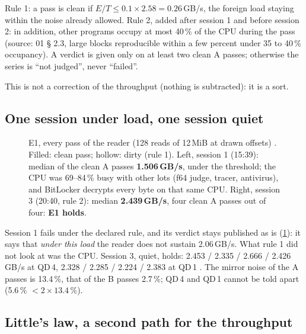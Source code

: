 \begin{definition}\label{def:t2c-propre}
Rule 1: a pass is clean if $E/T \le 0.1 \times 2.58 = 0.26$\,GB/s, the foreign load staying within the noise already allowed. Rule 2, added after session 1 and before session 2: in addition, other programs occupy at most 40\,\% of the CPU during the pass (source: 01 § 2.3, large blocks reproducible within a few percent under 35 to 40\,\% occupancy). A verdict is given only on at least two clean A passes; otherwise the series is ``not judged'', never ``failed''.
\end{definition}

This is not a correction of the throughput (nothing is subtracted): it is a sort.

\subsection{One session under load, one session quiet}

\begin{figure}[ht]
\centering
\GrapheChmEun
\caption[E1: the reader on the disk alone, two sessions]{E1, every pass of the reader (128 reads of 12\,MiB at drawn offsets) \mes. Filled: clean pass; hollow: dirty (rule 1). Left, session 1 (15:39): median of the clean A passes \textbf{1.506\,GB/s}, under the threshold; the CPU was 69--84\,\% busy with other lots (f64 judge, tracer, antivirus), and BitLocker decrypts every byte on that same CPU. Right, session 3 (20:40, rule 2): median \textbf{2.439\,GB/s}, four clean A passes out of four: \textbf{E1 holds}.}
\label{fig:t2c-e1}
\end{figure}

Session 1 fails under the declared rule, and its verdict stays published as is (\cref{fig:t2c-e1}): it says that \emph{under this load} the reader does not sustain 2.06\,GB/s. What rule 1 did not look at was the CPU. Session 3, quiet, holds: 2.453 / 2.335 / 2.666 / 2.426\,GB/s at QD\,4, 2.328 / 2.285 / 2.224 / 2.383 at QD\,1 \mes. The mirror noise of the A passes is 13.4\,\%, that of the B passes 2.7\,\%; QD\,4 and QD\,1 cannot be told apart (5.6\,\% $< 2 \times 13.4\,\%$).

\subsection{Little's law, a second path for the throughput}

